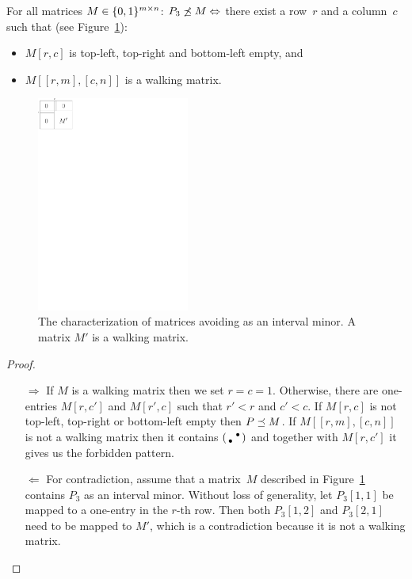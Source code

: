 \begin{prop}
\label{prop:p31}
For all matrices $M\in\{0,1\}^{m\times n}$: $P_3\not\preceq M\Leftrightarrow$ there exist a row~$r$ and a column~$c$ such that (see Figure~\ref{fig:p12}):
\begin{itemize}
\item $M[r,c]$ is top-left, top-right and bottom-left empty, and
\item $M[[r,m],[c,n]]$ is a walking matrix.
\end{itemize}
\end{prop}
\begin{figure}[!ht]
\centering
\includegraphics[width=50mm]{img/p12.pdf}
\caption{The characterization of matrices avoiding \usebox{\smlmat} as an interval minor. A matrix $M'$ is a walking matrix.}
\label{fig:p12}
\end{figure}
\begin{proof}
\begin{itemize}
	\item[$\Rightarrow$] If $M$ is a walking matrix then we set $r=c=1$. Otherwise, there are one-entries $M[r,c']$ and $M[r',c]$ such that $r'<r$ and $c'<c$. If $M[r,c]$ is not top-left, top-right or bottom-left empty then $P\preceq M$. If $M[[r,m],[c,n]]$ is not a walking matrix then it contains $\left(\begin{smallmatrix} &\bullet\\\bullet& \end{smallmatrix}\right)$ and together with $M[r,c']$ it gives us the forbidden pattern.
	\item[$\Leftarrow$] For contradiction, assume that a matrix~$M$ described in Figure~\ref{fig:p12} contains $P_3$ as an interval minor. Without loss of generality, let $P_3[1,1]$ be mapped to a one-entry in the $r$-th row. Then both $P_3[1,2]$ and $P_3[2,1]$ need to be mapped to $M'$, which is a contradiction because it is not a walking matrix.
\end{itemize}
\end{proof}

